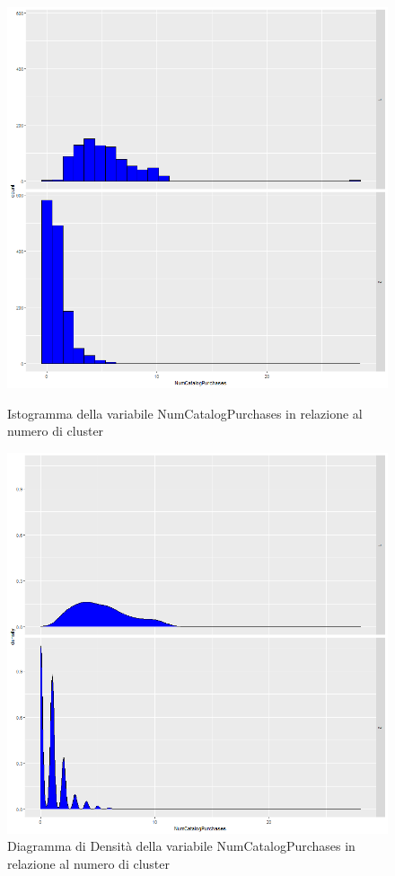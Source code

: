\documentclass[letterpaper,11pt]{article}
\begin{document}
\begin{figure}[H]
   \begin{minipage}{0.48\textwidth}
     \centering
         \includegraphics[width=1\textwidth]{Img/K-MEANS/KMEANS016.png}
    \caption{Istogramma della variabile NumCatalogPurchases in relazione al numero di cluster}
    \label{fig:NumCatalogPurchasesKmeansHistogram}
   \end{minipage}\hfill
   \begin{minipage}{0.48\textwidth}
     \centering
     \includegraphics[width=1\linewidth]{Img/K-MEANS/KMEANS017.png}
     \caption{Diagramma di Densità della variabile NumCatalogPurchases in relazione al numero di cluster}\label{fig:NumCatalogPurchasesKmeansDensity}
   \end{minipage}
\end{figure}
\end{document}

